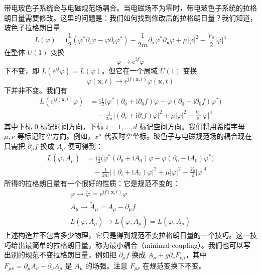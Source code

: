 带电玻色子系统会与电磁规范场耦合。当电磁场不为零时，带电玻色子系统的拉格朗日量需要修改。这里的问题是：我们如何找到修改后的拉格朗日量？我们知道，玻色子拉格朗日量
\begin{equation*}
L(\varphi)=\mathrm{i}\frac{1}{2}(\varphi^*\partial_t\varphi-\varphi\partial_t\varphi^*)-\frac{1}{2m}\partial_{\pmb{x}}\varphi^*\partial_{\pmb{x}}\varphi+\mu|\varphi|^2-\frac{V_0}{2}|\varphi|^4 \tag{3.7.1}
\end{equation*}
在整体 $U(1)$ 变换
\begin{equation*}
\varphi\rightarrow\mathrm{e}^{\mathrm{i}f}\varphi
\end{equation*}
下不变，即 $L(\mathrm{e}^{\mathrm{i}f}\varphi)=L(\varphi)$。但它在一个局域 $U(1)$ 变换
\begin{equation*}
\varphi(\pmb{x},t)\rightarrow\mathrm{e}^{\mathrm{i}f(\pmb{x},t)}\varphi(\pmb{x},t)
\end{equation*}
下并非不变。我们有
\begin{align*}
L(\mathrm{e}^{\mathrm{i}f(\pmb{x},t)}\varphi)&=\mathrm{i}\frac{1}{2}\big(\varphi^*(\partial_0+\mathrm{i}\partial_0f)\varphi-\varphi(\partial_0-\mathrm{i}\partial_0f)\varphi^*\big)\\
&\quad-\frac{1}{2m}\big|(\partial_i+\mathrm{i}\partial_if)\varphi\big|^2+\mu|\varphi|^2-\frac{V_0}{2}|\varphi|^4 \tag{3.7.2}
\end{align*}
其中下标 0 标记时间方向，下标 $i=1,\dots,d$ 标记空间方向。我们将用希腊字母 $\mu,\nu$ 等标记时空方向。例如，$x^\mu$ 代表时空坐标。玻色子与电磁规范场的耦合现在只需把 $\partial_\mu f$ 换成 $A_\mu$ 便可得到：
\begin{align*}
L(\varphi,A_\mu)&=\mathrm{i}\frac{1}{2}\big(\varphi^*(\partial_0+\mathrm{i}A_0)\varphi-\varphi(\partial_0-\mathrm{i}A_0)\varphi^*\big)\\
&\quad-\frac{1}{2m}\big|(\partial_i+\mathrm{i}A_i)\varphi\big|^2+\mu|\varphi|^2-\frac{V_0}{2}|\varphi|^4 \tag{3.7.3}
\end{align*}
所得的拉格朗日量有一个很好的性质：它是规范不变的：
\begin{gather*}
\varphi\rightarrow\tilde{\varphi}=\mathrm{e}^{\mathrm{i}f(\pmb{x},t)}\varphi\\
A_\mu\rightarrow\tilde{A}_\mu=A_\mu-\partial_\mu f\\
L(\varphi,A_\mu)\rightarrow L(\tilde{\varphi},\tilde{A}_\mu)=L(\varphi,A_\mu) \tag{3.7.4}
\end{gather*}
上述构造并不包含多少物理，它只是得到规范不变拉格朗日量的一个技巧。这一技巧给出最简单的拉格朗日量，称为最小耦合（minimal coupling）。我们也可以写出别的规范不变拉格朗日量，例如把 $\partial_\mu f$ 换成 $A_\mu+g\partial_\nu F_{\nu\mu}$，其中 $F_{\mu\nu}=\partial_\mu A_\nu-\partial_\nu A_\mu$ 是 $A_\mu$ 的场强。注意 $F_{\mu\nu}$ 在规范变换下不变。


